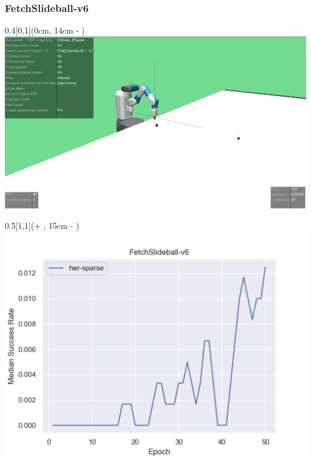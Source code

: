 


\begin{frame}
	\frametitle{FetchSlideball-v6}	
	\vspace{1cm}
	
	\begin{textblock*}{0.4\paperwidth}[0,1](0cm, 14cm - \PraesentationSeitenrand)%
		\includegraphics[width=0.4\paperwidth]{./Ressourcen/Figures/FetchSlideball-v6.pdf}
	\end{textblock*}
	
	\begin{textblock*}{0.5\paperwidth}[1,1](\textwidth + \PraesentationSeitenrand, 15cm - \PraesentationSeitenrand)%
		\includegraphics[width=0.5\paperwidth]{./Ressourcen/Figures/fig_FetchSlideball-v6.pdf}
	\end{textblock*}
	
\end{frame}
\clearpage


